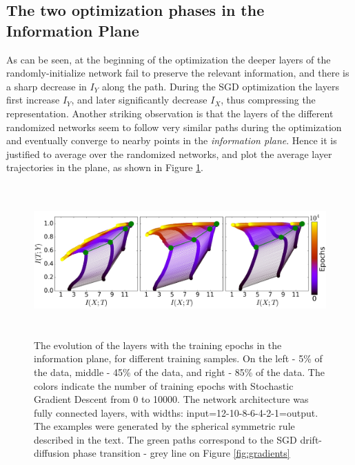 \documentclass[11pt]{article}
\begin{document}
\subsection{The two optimization phases in the Information Plane}

As can be seen, at the beginning of the optimization the deeper layers of the randomly-initialize network fail to preserve the relevant information, and there is a sharp decrease in $I_Y$ along the path.  During the SGD optimization the layers first increase $I_Y$,  and later significantly decrease $I_{X}$, thus compressing the representation. 
Another striking observation is that the layers of the different randomized networks seem to follow very similar paths during the optimization and eventually converge to nearby points in the \textit{information plane}. Hence it is justified to average over the randomized networks, and plot the average layer trajectories in the plane, as shown in Figure \ref{network_epochs}.


\begin{figure}[th]
\begin{centering}
\includegraphics[width=1.05\textwidth, height=5.8cm, scale = 0.6]{compare_percent.jpg}
\par\end{centering}
\caption{The evolution of the layers with the training epochs in the information plane, for different training samples. On the left - 5\% of the data, middle - 45\% of the data, and right - 85\% of the data. The colors indicate the number of training epochs with Stochastic Gradient Descent from 0 to 10000. The network architecture was fully connected layers, with widths: input=12-10-8-6-4-2-1=output. The examples were generated by the spherical symmetric rule described in the text. The green paths correspond to the SGD drift-diffusion phase transition - grey line on Figure \ref{fig:gradients} 
}
\label{network_epochs}
\vskip -0.1in
\end{figure}
\end{document}
